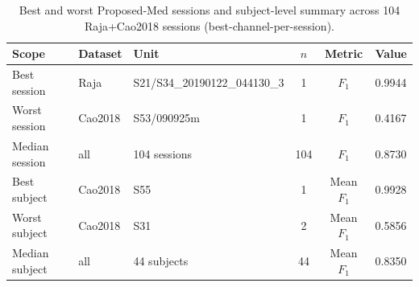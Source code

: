 \begin{table}[ht]
  \centering
  \caption{Best and worst Proposed-Med sessions and subject-level summary across 104 Raja+Cao2018 sessions (best-channel-per-session).}
  \label{tab:best-session}
  \begin{tabular}{lllccl}
    \toprule
    Scope & Dataset & Unit & $n$ & Metric & Value \\
    \midrule
    Best session & Raja & S21/S34\_20190122\_044130\_3 & 1 & $F_1$ & 0.9944 \\
    Worst session & Cao2018 & S53/090925m & 1 & $F_1$ & 0.4167 \\
    Median session & all & 104 sessions & 104 & $F_1$ & 0.8730 \\
    Best subject & Cao2018 & S55 & 1 & Mean $F_1$ & 0.9928 \\
    Worst subject & Cao2018 & S31 & 2 & Mean $F_1$ & 0.5856 \\
    Median subject & all & 44 subjects & 44 & Mean $F_1$ & 0.8350 \\
    \bottomrule
  \end{tabular}
\end{table}
